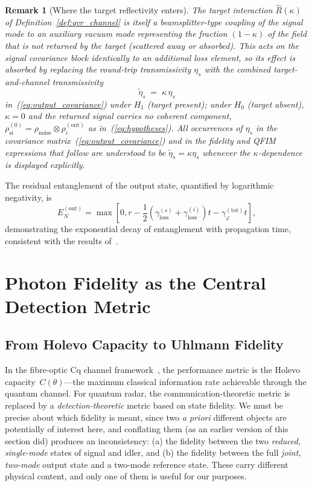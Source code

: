 \documentclass[journal]{IEEEtran}
\newtheorem{remark}{Remark}
\begin{document}
\begin{remark}[Where the target reflectivity enters]\label{rem:kappa}
The target interaction $\hat R(\kappa)$ of Definition~\ref{def:qvr_channel} is itself a beamsplitter-type coupling of the signal mode to an auxiliary vacuum mode representing the fraction $(1-\kappa)$ of the field that is not returned by the target (scattered away or absorbed). This acts on the signal covariance block identically to an additional loss element, so its effect is absorbed by replacing the round-trip transmissivity $\eta_s$ with the combined \emph{target-and-channel} transmissivity
\begin{equation}\label{eq:kappa_transmissivity}
\tilde\eta_s \;=\; \kappa\,\eta_s
\end{equation}
in~(\ref{eq:output_covariance}) under $H_1$ (target present); under $H_0$ (target absent), $\kappa=0$ and the returned signal carries no coherent component, $\rho_{\text{si}}^{(0)}=\rho_{\text{noise}}\otimes\rho_i^{(\text{out})}$ as in~(\ref{eq:hypotheses}). All occurrences of $\eta_s$ in the covariance matrix~(\ref{eq:output_covariance}) and in the fidelity and QFIM expressions that follow are understood to be $\tilde\eta_s=\kappa\eta_s$ whenever the $\kappa$-dependence is displayed explicitly.
\end{remark}

The residual entanglement of the output state, quantified by logarithmic negativity, is
\begin{equation}\label{eq:residual_entanglement}
E_N^{(\text{out})} = \max\left[0, r - \frac{1}{2}\left(\gamma_{\text{loss}}^{(s)} + \gamma_{\text{loss}}^{(i)}\right)t - \gamma_{\varphi}^{(\text{tot})}t\right],
\end{equation}
demonstrating the exponential decay of entanglement with propagation time, consistent with the results of~\cite{karsa2024quantum}.


\section{Photon Fidelity as the Central Detection Metric}\label{sec:fidelity}

\subsection{From Holevo Capacity to Uhlmann Fidelity}

In the fibre-optic Cq channel framework~\cite{gautum2024rigorous}, the performance metric is the Holevo capacity~$C(\theta)$---the maximum classical information rate achievable through the quantum channel. For quantum radar, the communication-theoretic metric is replaced by a \textit{detection-theoretic} metric based on state fidelity. We must be precise about which fidelity is meant, since two \emph{a priori} different objects are potentially of interest here, and conflating them (as an earlier version of this section did) produces an inconsistency: (a) the fidelity between the two \emph{reduced, single-mode} states of signal and idler, and (b) the fidelity between the full \emph{joint, two-mode} output state and a two-mode reference state. These carry different physical content, and only one of them is useful for our purposes.
\end{document}
